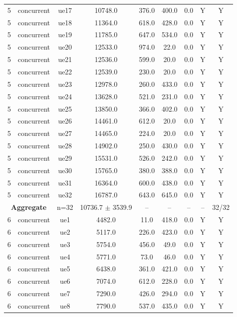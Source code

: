 \begin{table}[ht]
\begin{tabular}{|c|c|c|c|c|c|c|c|c|}
5 & concurrent & ue17 & 10748.0 & 376.0 & 400.0 & 0.0 & Y & Y \\
5 & concurrent & ue18 & 11364.0 & 618.0 & 428.0 & 0.0 & Y & Y \\
5 & concurrent & ue19 & 11785.0 & 647.0 & 534.0 & 0.0 & Y & Y \\
5 & concurrent & ue20 & 12533.0 & 974.0 & 22.0 & 0.0 & Y & Y \\
5 & concurrent & ue21 & 12536.0 & 599.0 & 20.0 & 0.0 & Y & Y \\
5 & concurrent & ue22 & 12539.0 & 230.0 & 20.0 & 0.0 & Y & Y \\
5 & concurrent & ue23 & 12978.0 & 260.0 & 433.0 & 0.0 & Y & Y \\
5 & concurrent & ue24 & 13628.0 & 521.0 & 231.0 & 0.0 & Y & Y \\
5 & concurrent & ue25 & 13850.0 & 366.0 & 402.0 & 0.0 & Y & Y \\
5 & concurrent & ue26 & 14461.0 & 612.0 & 20.0 & 0.0 & Y & Y \\
5 & concurrent & ue27 & 14465.0 & 224.0 & 20.0 & 0.0 & Y & Y \\
5 & concurrent & ue28 & 14902.0 & 250.0 & 430.0 & 0.0 & Y & Y \\
5 & concurrent & ue29 & 15531.0 & 526.0 & 242.0 & 0.0 & Y & Y \\
5 & concurrent & ue30 & 15765.0 & 380.0 & 388.0 & 0.0 & Y & Y \\
5 & concurrent & ue31 & 16364.0 & 600.0 & 438.0 & 0.0 & Y & Y \\
5 & concurrent & ue32 & 16787.0 & 643.0 & 645.0 & 0.0 & Y & Y \\
\multicolumn{2}{|c|}{\textbf{Aggregate}} & n=32 & 10736.7 $\pm$ 3539.9 & -- & -- & -- & -- & 32/32 \\
\hline
6 & concurrent & ue1 & 4482.0 & 11.0 & 418.0 & 0.0 & Y & Y \\
6 & concurrent & ue2 & 5117.0 & 226.0 & 423.0 & 0.0 & Y & Y \\
6 & concurrent & ue3 & 5754.0 & 456.0 & 49.0 & 0.0 & Y & Y \\
6 & concurrent & ue4 & 5771.0 & 73.0 & 46.0 & 0.0 & Y & Y \\
6 & concurrent & ue5 & 6438.0 & 361.0 & 421.0 & 0.0 & Y & Y \\
6 & concurrent & ue6 & 7074.0 & 612.0 & 228.0 & 0.0 & Y & Y \\
6 & concurrent & ue7 & 7290.0 & 426.0 & 294.0 & 0.0 & Y & Y \\
6 & concurrent & ue8 & 7790.0 & 537.0 & 435.0 & 0.0 & Y & Y \\

\end{tabular}
\end{table}
